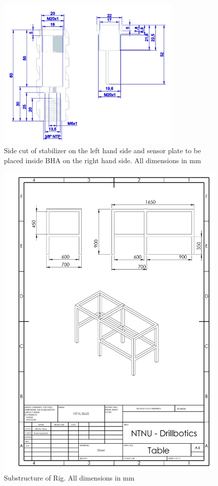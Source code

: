 \begin{figure} [H]
\centering
\includegraphics[width=0.8\textwidth]{figures/stabdim}
\caption{Side cut of stabilizer on the left hand side and sensor plate to be placed inside BHA on the right hand side. All dimensions in mm} 
\label{fig:StabDim}
\end{figure}

\newpage
\begin{figure} [H]
\centering
\includegraphics[width=1.0\textwidth]{figures/mechdrawings/Table.JPG}
\caption{Substructure of Rig. All dimensions in mm} 
\label{fig:table}
\end{figure}

